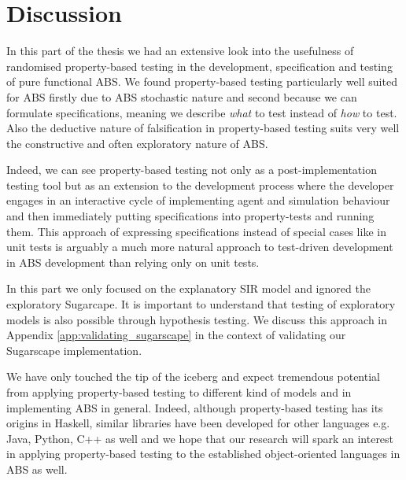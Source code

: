 \chapter*{Discussion}
In this part of the thesis we had an extensive look into the usefulness of randomised property-based testing in the development, specification and testing of pure functional ABS. We found property-based testing particularly well suited for ABS firstly due to ABS stochastic nature and second because we can formulate specifications, meaning we describe \textit{what} to test instead of \textit{how} to test. Also the deductive nature of falsification in property-based testing suits very well the constructive and often exploratory nature of ABS. 

Indeed, we can see property-based testing not only as a post-implementation testing tool but as an extension to the development process where the developer engages in an interactive cycle of implementing agent and simulation behaviour and then immediately putting specifications into property-tests and running them. This approach of expressing specifications instead of special cases like in unit tests is arguably a much more natural approach to test-driven development in ABS development than relying only on unit tests.

In this part we only focused on the explanatory SIR model and ignored the exploratory Sugarcape. It is important to understand that testing of exploratory models is also possible through hypothesis testing. We discuss this approach in Appendix \ref{app:validating_sugarscape} in the context of validating our Sugarscape implementation.

We have only touched the tip of the iceberg and expect tremendous potential from applying property-based testing to different kind of models and in implementing ABS in general. Indeed, although property-based testing has its origins in Haskell, similar libraries have been developed for other languages e.g. Java, Python, C++ as well and we hope that our research will spark an interest in applying property-based testing to the established object-oriented languages in ABS as well.